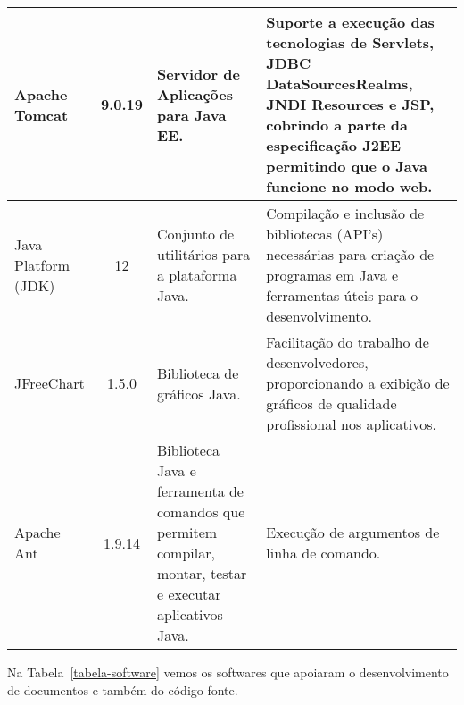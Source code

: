 \begin{table}[h]
\begin{tabular}{|p{1.6cm}|c|p{5cm}|p{6.5cm}|}
		Apache Tomcat & 9.0.19 & Servidor de Aplicações para Java EE. & Suporte a execução das tecnologias de Servlets, JDBC DataSourcesRealms, JNDI Resources e JSP, cobrindo a parte da especificação J2EE permitindo que o Java funcione no modo web. \\\hline
		
		Java Platform (JDK) & 12 & Conjunto de utilitários para a plataforma Java. & Compilação e inclusão de bibliotecas (API’s) necessárias para criação de programas em Java e ferramentas úteis para o desenvolvimento. \\\hline
		
		JFreeChart & 1.5.0 & Biblioteca de gráficos Java. & Facilitação do trabalho de desenvolvedores, proporcionando a exibição de gráficos de qualidade profissional nos aplicativos. \\\hline		
		
		Apache Ant & 1.9.14 & Biblioteca Java e ferramenta de comandos que permitem compilar, montar, testar e executar aplicativos Java. & Execução de argumentos de linha de comando. \\\hline
	\end{tabular}
\end{table}







\newpage
Na Tabela~\ref{tabela-software} vemos os softwares que apoiaram o desenvolvimento de documentos e também do código fonte.

